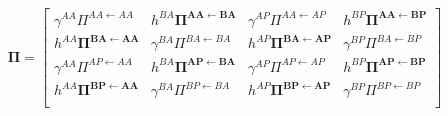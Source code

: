\documentclass[letterpaper,12pt]{article}
\newcommand{\pito}[2]{\Pi^{#1 \gets #2}}
\begin{document}
\begin{align}
    \mathbf{\Pi} = 
    \begin{bmatrix}
        \gamma^{AA}\pito{AA}{AA} & h^{BA}\mathbf{\pito{AA}{BA}} & \gamma^{AP}\pito{AA}{AP} &
        h^{BP}\mathbf{\pito{AA}{BP}} \\
        h^{AA}\mathbf{\pito{BA}{AA}} & \gamma^{BA}\pito{BA}{BA} &
        h^{AP}\mathbf{\pito{BA}{AP}} & \gamma^{BP}\pito{BA}{BP} \\
        \gamma^{AA}\pito{AP}{AA} & h^{BA}\mathbf{\pito{AP}{BA}} & \gamma^{AP}\pito{AP}{AP} &
        h^{BP}\mathbf{\pito{AP}{BP}} \\
        h^{AA}\mathbf{\pito{BP}{AA}} & \gamma^{BA}\pito{BP}{BA} &
        h^{AP}\mathbf{\pito{BP}{AP}} & \gamma^{BP}\pito{BP}{BP} \\
    \end{bmatrix}
\end{align}
\end{document}
